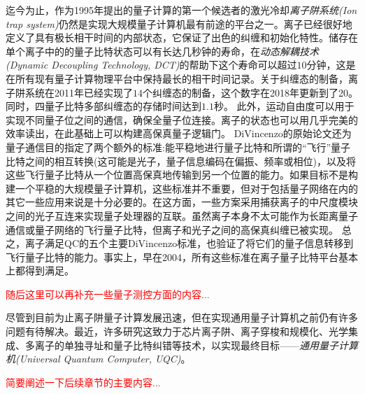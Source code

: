迄今为止，作为1995年提出的量子计算的第一个候选者的激光冷却\emph{离子阱系统(Ion trap system)}仍然是实现大规模量子计算机最有前途的平台之一。离子已经很好地定义了具有极长相干时间\cite[]{Fisk_Sellars_Lawn_Coles_1997}的内部状态，它保证了出色的纠缠和初始化特性\cite[]{Blatt_Wineland_2008}。储存在单个离子中的的量子比特状态可以有长达几秒钟的寿命\cite[]{Langer_Ozeri_Jost_Chiaverini_DeMarco_Ben_Kish_Blakestad_Britton_Hume_Itano_et_al_2005}，在\emph{动态解耦技术(Dynamic Decoupling Technology, DCT)}的帮助下这个寿命可以超过$10$分钟\cite[]{Wang_Um_Zhang_An_Lyu_Zhang_Duan_Yum_Kim_2017}，这是在所有现有量子计算物理平台中保持最长的相干时间记录。关于纠缠态的制备，离子阱系统在2011年已经实现了$14$个纠缠态的制备\cite[]{Monz_Schindler_Barreiro_Chwalla_Nigg_Coish_Harlander_Hänsel_Hennrich_Blatt_2011}，这个数字在2018年更新到了20\cite[]{Friis_Marty_Maier_Hempel_Holzäpfel_Jurcevic_Plenio_Huber_Roos_Blatt_et_al_2018}。同时，四量子比特多部纠缠态的存储时间达到$1.1$秒\cite[]{Kaufmann_Ruster_Schmiegelow_Luda_Kaushal_Schulz_von_Lindenfels_Schmidt_Kaler_Poschinger_2017}。
此外，运动自由度可以用于实现不同量子位之间的通信，确保全量子位连接\cite[]{Debnath_Linke_Figgatt_Landsman_Wright_Monroe_2016}。离子的状态也可以用几乎完美的效率读出\cite[]{Myerson_Szwer_Webster_Allcock_Curtis_Imreh_Sherman_Stacey_Steane_Lucas_2008}，在此基础上可以构建高保真量子逻辑门\cite[]{Ballance_Harty_Linke_Sepiol_Lucas_2016}。
DiVincenzo的原始论文还为量子通信目的指定了两个额外的标准:能平稳地进行量子比特和所谓的“飞行”量子比特之间的相互转换(这可能是光子，量子信息编码在偏振、频率或相位)，以及将这些飞行量子比特从一个位置高保真地传输到另一个位置的能力。如果目标不是构建一个平稳的大规模量子计算机，这些标准并不重要，但对于包括量子网络在内的其它一些应用来说是十分必要的。在这方面，一些方案采用捕获离子的中尺度模块之间的光子互连来实现量子处理器的互联\cite[]{Monroe_Raussendorf_Ruthven_Brown_Maunz_Duan_Kim_2014}。虽然离子本身不太可能作为长距离量子通信或量子网络的飞行量子比特，但离子和光子之间的高保真纠缠已被实现\cite[]{Moehring_Blinov_Madsen_Duan_Monroe_2004}。
总之，离子满足QC的五个主要DiVincenzo标准，也验证了将它们的量子信息转移到飞行量子比特的能力。事实上，早在2004，所有这些标准在离子量子比特平台基本上都得到满足\cite[]{Leibfried_DeMarco_Meyer_Lucas_Barrett_Britton_Itano_Jelenković_Langer_Rosenband_et_al_2003,Moehring_Blinov_Madsen_Duan_Monroe_2004}。

\textcolor{red}{随后这里可以再补充一些量子测控方面的内容...}

尽管到目前为止离子阱量子计算发展迅速，但在实现通用量子计算机之前仍有许多问题有待解决。最近，许多研究这致力于芯片离子阱\cite[]{Mehta_Eltony_Bruzewicz_Chuang_Ram_Sage_Chiaverini_2014}、离子穿梭和规模化\cite[]{Monroe_Kim_2013, Sterling_Rattanasonti_Weidt_Lake_Srinivasan_Webster_Kraft_Hensinger_2014, Lee_Jeong_Park_Jung_Kim_Cho_2021}、光学集成\cite[]{Niffenegger_Stuart_Sorace_Agaskar_Kharas_Bramhavar_Bruzewicz_Loh_Maxson_McConnell_Reens_et_al_2020, Mehta_Zhang_Malinowski_Nguyen_Stadler_Home_2020}、多离子的单独寻址\cite[]{Ivory_Setzer_Karl_McGuinness_DeRose_Blain_Stick_Gehl_Parazzoli_2020}和量子比特纠错\cite[]{Cramer_Kalb_Rol_Hensen_Blok_Markham_Twitchen_Hanson_Taminiau_2016,Reichardt_2021}等技术，以实现最终目标——\emph{通用量子计算机(Universal Quantum Computer, UQC)}。

\textcolor{red}{简要阐述一下后续章节的主要内容...}
